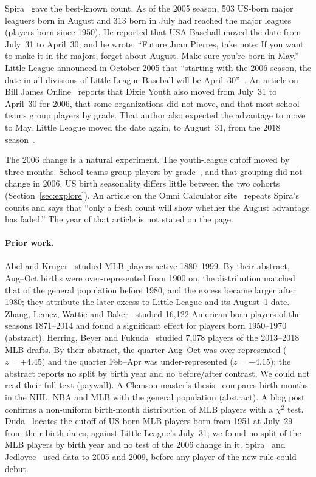 \documentclass[11pt]{article}
\begin{document}
Spira~\cite{spira2008} gave the best-known count. As of the 2005 season, 503 US-born major leaguers born in August and 313 born in July had reached the major leagues (players born since 1950). He reported that USA Baseball moved the date from July~31 to April~30, and he wrote: ``Future Juan Pierres, take note: If you want to make it in the majors, forget about August. Make sure you're born in May.'' Little League announced in October 2005 that ``starting with the 2006 season, the date in all divisions of Little League Baseball will be April~30''~\cite{ll2005}. An article on Bill James Online~\cite{jedlovec2009} reports that Dixie Youth also moved from July~31 to April~30 for 2006, that some organizations did not move, and that most school teams group players by grade. That author also expected the advantage to move to May. Little League moved the date again, to August~31, from the 2018 season~\cite{ll2015}.

The 2006 change is a natural experiment. The youth-league cutoff moved by three months. School teams group players by grade~\cite{jedlovec2009}, and that grouping did not change in 2006. US birth seasonality differs little between the two cohorts (Section~\ref{sec:explore}). An article on the Omni Calculator site~\cite{siuda} repeats Spira's counts and says that ``only a fresh count will show whether the August advantage has faded.'' The year of that article is not stated on the page.

\paragraph{Prior work.}
Abel and Kruger~\cite{abel2005} studied MLB players active 1880--1999. By their abstract, Aug--Oct births were over-represented from 1900 on, the distribution matched that of the general population before 1980, and the excess became larger after 1980; they attribute the later excess to Little League and its August~1 date. Zhang, Lemez, Wattie and Baker~\cite{zhang2018} studied 16{,}122 American-born players of the seasons 1871--2014 and found a significant effect for players born 1950--1970 (abstract). Herring, Beyer and Fukuda~\cite{herring2021} studied 7{,}078 players of the 2013--2018 MLB drafts. By their abstract, the quarter Aug--Oct was over-represented ($z = +4.45$) and the quarter Feb--Apr was under-represented ($z = -4.15$); the abstract reports no split by birth year and no before/after contrast. We could not read their full text (paywall). A Clemson master's thesis~\cite{hensley2020} compares birth months in the NHL, NBA and MLB with the general population (abstract). A blog post~\cite{collier2016} confirms a non-uniform birth-month distribution of MLB players with a $\chi^2$ test. Duda~\cite{duda2026} locates the cutoff of US-born MLB players born from 1951 at July~29 from their birth dates, against Little League's July~31; we found no split of the MLB players by birth year and no test of the 2006 change in it. Spira~\cite{spira2008} and Jedlovec~\cite{jedlovec2009} used data to 2005 and 2009, before any player of the new rule could debut.
\end{document}
